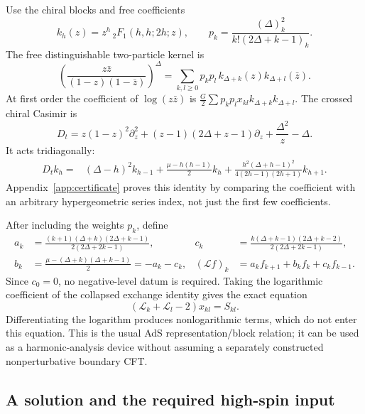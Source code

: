 \documentclass[11pt,a4paper]{article}
\numberwithin{equation}{section}
\theoremstyle{remark}\newtheorem{remark}[theorem]{Remark}
\begin{document}
Use the chiral blocks and free coefficients
\begin{equation}
 k_h(z)=z^h\,{}_2F_1(h,h;2h;z),\qquad
 p_k=\frac{(\Delta)_k^2}{k!(2\Delta+k-1)_k}.
\end{equation}
The free distinguishable two-particle kernel is
\begin{equation}
 \left(\frac{z\bar z}{(1-z)(1-\bar z)}\right)^\Delta
 =\sum_{k,l\geq0}p_kp_l\,k_{\Delta+k}(z)k_{\Delta+l}(\bar z).
\end{equation}
At first order the coefficient of $\log(z\bar z)$ is
$\frac G2\sum p_kp_l x_{kl}k_{\Delta+k}k_{\Delta+l}$. The crossed chiral Casimir is
\begin{equation}
 D_t=z(1-z)^2\partial_z^2+(z-1)(2\Delta+z-1)\partial_z
 +\frac{\Delta^2}{z}-\Delta.
\end{equation}
It acts tridiagonally:
\begin{align}
 D_tk_h={}&(\Delta-h)^2k_{h-1}
 +\frac{\mu-h(h-1)}2k_h
 +\frac{h^2(\Delta+h-1)^2}{4(2h-1)(2h+1)}k_{h+1}.
 \label{eq:threeblock}
\end{align}
Appendix~\ref{app:certificate} proves this identity by comparing the coefficient with an arbitrary hypergeometric series index, not just the first few coefficients.

After including the weights $p_k$, define
\begin{align}
 a_k&=\frac{(k+1)(\Delta+k)(2\Delta+k-1)}{2(2\Delta+2k-1)},&
 c_k&=\frac{k(\Delta+k-1)(2\Delta+k-2)}{2(2\Delta+2k-1)},\\
 b_k&=\frac{\mu-(\Delta+k)(\Delta+k-1)}2=-a_k-c_k,&
 (\mathcal L f)_k&=a_kf_{k+1}+b_kf_k+c_kf_{k-1}.
 \label{eq:abc}
\end{align}
Since $c_0=0$, no negative-level datum is required. Taking the logarithmic coefficient of the collapsed exchange identity gives the exact equation
\begin{equation}
 \boxed{(\mathcal L_k+\mathcal L_l-2)x_{kl}=S_{kl}.}
 \label{eq:crossrec}
\end{equation}
Differentiating the logarithm produces nonlogarithmic terms, which do not enter this equation. This is the usual AdS representation/block relation; it can be used as a harmonic-analysis device without assuming a separately constructed nonperturbative boundary CFT.

\subsection{A solution and the required high-spin input}
\end{document}
